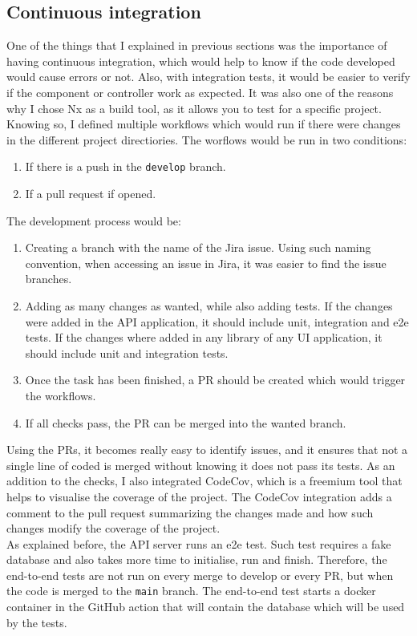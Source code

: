 \documentclass[a4paper, 12pt, oneside]{book}
\begin{document}
\subsection{Continuous integration}
One of the things that I explained in previous sections was the importance of having continuous integration, which would help to know if the code developed would cause errors or not. Also, with integration tests, it would be easier to verify if the component or controller work as expected. It was also one of the reasons why I chose Nx as a build tool, as it allows you to test for a specific project.
\\[8pt]
Knowing so, I defined multiple workflows which would run if there were changes in the different project directiories. The worflows would be run in two conditions:
\begin{enumerate}
	\item If there is a push in the \texttt{develop} branch.
	\item If a pull request if opened.
\end{enumerate}
The development process would be:
\begin{enumerate}
	\item Creating a branch with the name of the Jira issue. Using such naming convention, when accessing an issue in Jira, it was easier to find the issue branches.
	\item Adding as many changes as wanted, while also adding tests. If the changes were added in the API application, it should include unit, integration and e2e tests. If the changes where added in any library of any UI application, it should include unit and integration tests.
 \item Once the task has been finished, a PR should be created which would trigger the workflows.
 \item If all checks pass, the PR can be merged into the wanted branch.
\end{enumerate}
Using the PRs, it becomes really easy to identify issues, and it ensures that not a single line of coded is merged without knowing it does not pass its tests. As an addition to the checks, I also integrated CodeCov, which is a freemium tool that helps to visualise the coverage of the project. The CodeCov integration adds a comment to the pull request summarizing the changes made and how such changes modify the coverage of the project.
\\[8pt] 
As explained before, the API server runs an e2e test. Such test requires a fake database and also takes more time to initialise, run and finish. Therefore, the end-to-end tests are not run on every merge to develop or every PR, but when the code is merged to the \texttt{main} branch. The end-to-end test starts a docker container in the GitHub action that will contain the database which will be used by the tests.
\end{document}
